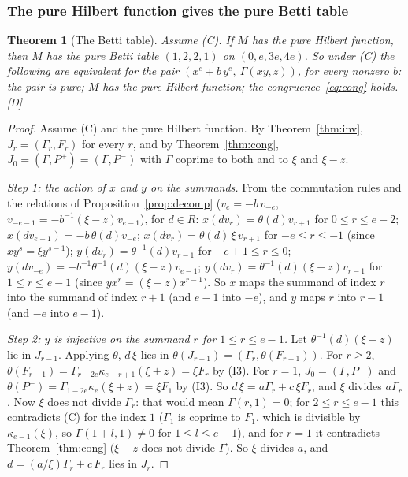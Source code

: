 \documentclass[11pt]{article}
\newtheorem{thmletter}{Theorem}
\theoremstyle{definition}
\theoremstyle{remark}
\begin{document}
\subsubsection*{The pure Hilbert function gives the pure Betti table}

\begin{thmletter}[The Betti table]\label{thm:betti}
Assume (C). If $M$ has the pure Hilbert function, then $M$ has the pure Betti table $(1,2,2,1)$ on $(0,e,3e,4e)$. So under (C) the following are equivalent for the pair $(x^e+b\,y^e,\ \Gamma(xy,z))$, for every nonzero $b$: the pair is pure; $M$ has the pure Hilbert function; the congruence~\eqref{eq:cong} holds. [D]
\end{thmletter}
\begin{proof}
Assume (C) and the pure Hilbert function. By Theorem~\ref{thm:inv}, $J_r=(\Gamma_r,F_r)$ for every $r$, and by Theorem~\ref{thm:cong}, $J_0=(\Gamma,P^+)=(\Gamma,P^-)$ with $\Gamma$ coprime to both and to $\xi$ and $\xi-z$.

\emph{Step 1: the action of $x$ and $y$ on the summands.} From the commutation rules and the relations of Proposition~\ref{prop:decomp} ($v_e=-b\,v_{-e}$, $v_{-e-1}=-b^{-1}(\xi-z)v_{e-1}$), for $d\in R$: $x(dv_r)=\theta(d)v_{r+1}$ for $0\le r\le e-2$; $x(dv_{e-1})=-b\,\theta(d)v_{-e}$; $x(dv_r)=\theta(d)\,\xi\,v_{r+1}$ for $-e\le r\le-1$ (since $xy^s=\xi y^{s-1}$); $y(dv_r)=\theta^{-1}(d)v_{r-1}$ for $-e+1\le r\le0$; $y(dv_{-e})=-b^{-1}\theta^{-1}(d)(\xi-z)v_{e-1}$; $y(dv_r)=\theta^{-1}(d)(\xi-z)v_{r-1}$ for $1\le r\le e-1$ (since $yx^r=(\xi-z)x^{r-1}$). So $x$ maps the summand of index $r$ into the summand of index $r+1$ (and $e-1$ into $-e$), and $y$ maps $r$ into $r-1$ (and $-e$ into $e-1$).

\emph{Step 2: $y$ is injective on the summand $r$ for $1\le r\le e-1$.} Let $\theta^{-1}(d)(\xi-z)$ lie in $J_{r-1}$. Applying $\theta$, $d\,\xi$ lies in $\theta(J_{r-1})=(\Gamma_r,\theta(F_{r-1}))$. For $r\ge2$, $\theta(F_{r-1})=\Gamma_{r-2e}\kappa_{e-r+1}(\xi+z)=\xi F_r$ by (I3). For $r=1$, $J_0=(\Gamma,P^-)$ and $\theta(P^-)=\Gamma_{1-2e}\kappa_e(\xi+z)=\xi F_1$ by (I3). So $d\,\xi=a\Gamma_r+c\,\xi F_r$, and $\xi$ divides $a\Gamma_r$. Now $\xi$ does not divide $\Gamma_r$: that would mean $\Gamma(r,1)=0$; for $2\le r\le e-1$ this contradicts (C) for the index $1$ ($\Gamma_1$ is coprime to $F_1$, which is divisible by $\kappa_{e-1}(\xi)$, so $\Gamma(1+l,1)\ne0$ for $1\le l\le e-1$), and for $r=1$ it contradicts Theorem~\ref{thm:cong} ($\xi-z$ does not divide $\Gamma$). So $\xi$ divides $a$, and $d=(a/\xi)\Gamma_r+c\,F_r$ lies in $J_r$.


\end{proof}
\end{document}
